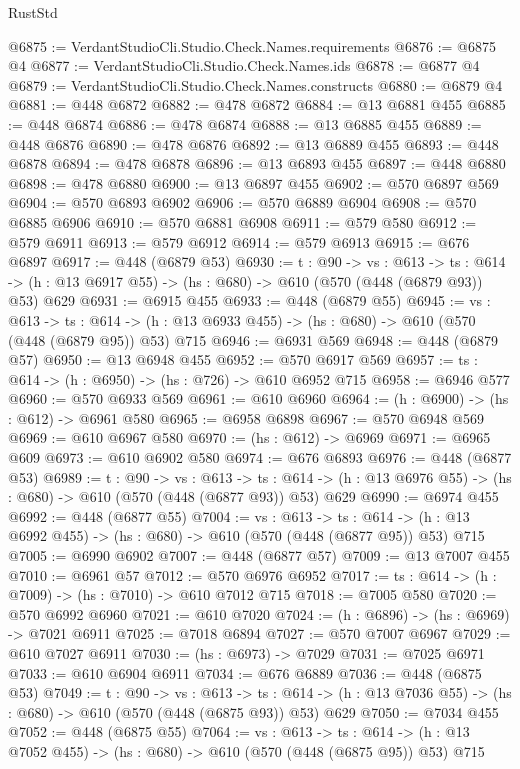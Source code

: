 \begin{lexlean}{RustStd}
\begin{coremodule}
@6875 := VerdantStudioCli.Studio.Check.Names.requirements
@6876 := @6875 @4
@6877 := VerdantStudioCli.Studio.Check.Names.ids
@6878 := @6877 @4
@6879 := VerdantStudioCli.Studio.Check.Names.constructs
@6880 := @6879 @4
@6881 := @448 @6872
@6882 := @478 @6872
@6884 := @13 @6881 @455
@6885 := @448 @6874
@6886 := @478 @6874
@6888 := @13 @6885 @455
@6889 := @448 @6876
@6890 := @478 @6876
@6892 := @13 @6889 @455
@6893 := @448 @6878
@6894 := @478 @6878
@6896 := @13 @6893 @455
@6897 := @448 @6880
@6898 := @478 @6880
@6900 := @13 @6897 @455
@6902 := @570 @6897 @569
@6904 := @570 @6893 @6902
@6906 := @570 @6889 @6904
@6908 := @570 @6885 @6906
@6910 := @570 @6881 @6908
@6911 := @579 @580
@6912 := @579 @6911
@6913 := @579 @6912
@6914 := @579 @6913
@6915 := @676 @6897
@6917 := @448 (@6879 @53)
@6930 := {t : @90} ->
  {vs : @613} ->
  {ts : @614} -> (h : @13 @6917 @55) -> (hs : @680) -> @610 (@570 (@448 (@6879 @93)) @53) @629
@6931 := @6915 @455
@6933 := @448 (@6879 @55)
@6945 := {vs : @613} ->
  {ts : @614} -> (h : @13 @6933 @455) -> (hs : @680) -> @610 (@570 (@448 (@6879 @95)) @53) @715
@6946 := @6931 @569
@6948 := @448 (@6879 @57)
@6950 := @13 @6948 @455
@6952 := @570 @6917 @569
@6957 := {ts : @614} -> (h : @6950) -> (hs : @726) -> @610 @6952 @715
@6958 := @6946 @577
@6960 := @570 @6933 @569
@6961 := @610 @6960
@6964 := (h : @6900) -> (hs : @612) -> @6961 @580
@6965 := @6958 @6898
@6967 := @570 @6948 @569
@6969 := @610 @6967 @580
@6970 := (hs : @612) -> @6969
@6971 := @6965 @609
@6973 := @610 @6902 @580
@6974 := @676 @6893
@6976 := @448 (@6877 @53)
@6989 := {t : @90} ->
  {vs : @613} ->
  {ts : @614} -> (h : @13 @6976 @55) -> (hs : @680) -> @610 (@570 (@448 (@6877 @93)) @53) @629
@6990 := @6974 @455
@6992 := @448 (@6877 @55)
@7004 := {vs : @613} ->
  {ts : @614} -> (h : @13 @6992 @455) -> (hs : @680) -> @610 (@570 (@448 (@6877 @95)) @53) @715
@7005 := @6990 @6902
@7007 := @448 (@6877 @57)
@7009 := @13 @7007 @455
@7010 := @6961 @57
@7012 := @570 @6976 @6952
@7017 := {ts : @614} -> (h : @7009) -> (hs : @7010) -> @610 @7012 @715
@7018 := @7005 @580
@7020 := @570 @6992 @6960
@7021 := @610 @7020
@7024 := (h : @6896) -> (hs : @6969) -> @7021 @6911
@7025 := @7018 @6894
@7027 := @570 @7007 @6967
@7029 := @610 @7027 @6911
@7030 := (hs : @6973) -> @7029
@7031 := @7025 @6971
@7033 := @610 @6904 @6911
@7034 := @676 @6889
@7036 := @448 (@6875 @53)
@7049 := {t : @90} ->
  {vs : @613} ->
  {ts : @614} -> (h : @13 @7036 @55) -> (hs : @680) -> @610 (@570 (@448 (@6875 @93)) @53) @629
@7050 := @7034 @455
@7052 := @448 (@6875 @55)
@7064 := {vs : @613} ->
  {ts : @614} -> (h : @13 @7052 @455) -> (hs : @680) -> @610 (@570 (@448 (@6875 @95)) @53) @715

\end{coremodule}
\end{lexlean}
